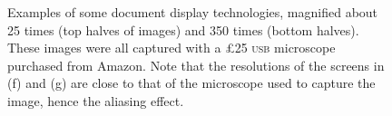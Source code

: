 \begin{figure}
\begin{centering}
         \hspace{1mm} 
         \hspace{1mm} 

    \end{centering}

    \caption[Examples of document display technologies]{Examples of some document display technologies, magnified about 25 times (top halves of images) and 350 times (bottom halves). These images were all captured with a \pounds 25 \textsc{usb} microscope purchased from Amazon. Note that the resolutions of the screens in (f) and (g) are close to that of the microscope used to capture the image, hence the aliasing effect.}
    \label{fig:screens}
\end{figure}


